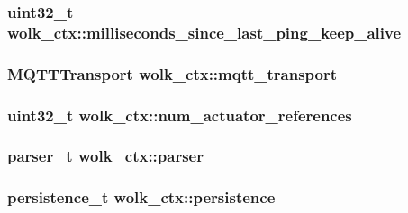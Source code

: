 \subsubsection[{\texorpdfstring{milliseconds\+\_\+since\+\_\+last\+\_\+ping\+\_\+keep\+\_\+alive}{milliseconds_since_last_ping_keep_alive}}]{\setlength{\rightskip}{0pt plus 5cm}uint32\+\_\+t wolk\+\_\+ctx\+::milliseconds\+\_\+since\+\_\+last\+\_\+ping\+\_\+keep\+\_\+alive}\hypertarget{structwolk__ctx_a2d93b135a08863cedae25012a6dc8d46}{}\label{structwolk__ctx_a2d93b135a08863cedae25012a6dc8d46}
\subsubsection[{\texorpdfstring{mqtt\+\_\+transport}{mqtt_transport}}]{\setlength{\rightskip}{0pt plus 5cm}M\+Q\+T\+T\+Transport wolk\+\_\+ctx\+::mqtt\+\_\+transport}\hypertarget{structwolk__ctx_a1f8d853e9ce94634dde14f0735207e5c}{}\label{structwolk__ctx_a1f8d853e9ce94634dde14f0735207e5c}
\subsubsection[{\texorpdfstring{num\+\_\+actuator\+\_\+references}{num_actuator_references}}]{\setlength{\rightskip}{0pt plus 5cm}uint32\+\_\+t wolk\+\_\+ctx\+::num\+\_\+actuator\+\_\+references}\hypertarget{structwolk__ctx_a23e98a97649d679e4a85c87f2da1f8e5}{}\label{structwolk__ctx_a23e98a97649d679e4a85c87f2da1f8e5}
\subsubsection[{\texorpdfstring{parser}{parser}}]{\setlength{\rightskip}{0pt plus 5cm}parser\+\_\+t wolk\+\_\+ctx\+::parser}\hypertarget{structwolk__ctx_a823bd0528ef9d148f35d244becc4858a}{}\label{structwolk__ctx_a823bd0528ef9d148f35d244becc4858a}
\subsubsection[{\texorpdfstring{persistence}{persistence}}]{\setlength{\rightskip}{0pt plus 5cm}persistence\+\_\+t wolk\+\_\+ctx\+::persistence}\hypertarget{structwolk__ctx_a9d7d83e339fcd632b0679db3f86b4293}{}\label{structwolk__ctx_a9d7d83e339fcd632b0679db3f86b4293}
